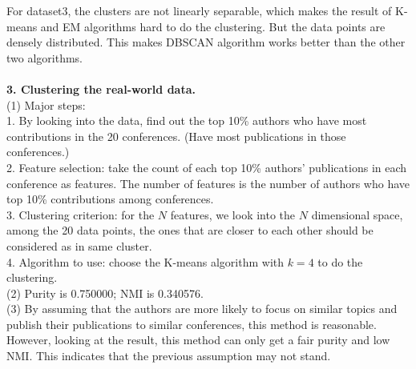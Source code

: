 \documentclass[11pt,a4paper,fleqn]{article}
\begin{document}
For dataset3, the clusters are not linearly separable, which makes the result of K-means and EM algorithms hard to do the clustering. But the data points are densely distributed. This makes DBSCAN algorithm works better than the other two algorithms.\\ \\
\textbf{3. Clustering the real-world data.}\\
(1) Major steps: \\
1. By looking into the data, find out the top 10\% authors who have most contributions in the 20 conferences. (Have most publications in those conferences.)\\
2. Feature selection: take the count of each top 10\% authors' publications in each conference as features. The number of features is the number of authors who have top 10\% contributions among conferences.\\
3. Clustering criterion: for the $N$ features, we look into the $N$ dimensional space, among the 20 data points, the ones that are closer to each other should be considered as in same cluster.\\
4. Algorithm to use: choose the K-means algorithm with $k=4$ to do the clustering.\\
(2) Purity is 0.750000; NMI is 0.340576.\\
(3) By assuming that the authors are more likely to focus on similar topics and publish their publications to similar conferences, this method is reasonable. However, looking at the result, this method can only get a fair purity and low NMI. This indicates that the previous assumption may not stand.
\end{document}
